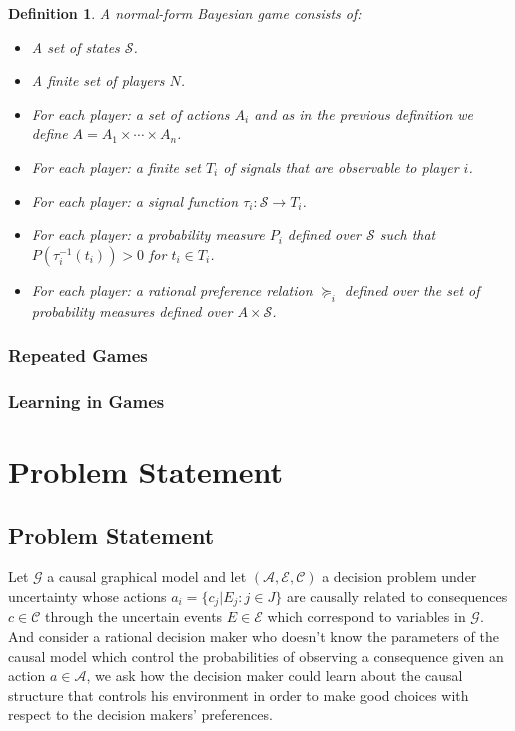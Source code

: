 \documentclass[11pt]{article}
\theoremstyle{plain}
\newtheorem{defi}[teo]{Definition}
\begin{document}
\begin{defi}
A normal-form Bayesian game consists of:
\begin{itemize}
\item A set of states $\mathcal{S}$.
\item A finite set of players $N$.
\item For each player: a set of actions $A_i$ and as in the previous definition we define $A= A_1 \times \cdots \times A_n$.
\item For each player: a finite set $T_i$ of \textit{signals} that are observable to player $i$.
\item For each player: a signal function $\tau_i : \mathcal{S} \to T_i$.
\item For each player: a probability measure $P_i$ defined over $\mathcal{S}$ such that $P(\tau^{-1}_i (t_i)) >0$ for $t_i \in T_i$.
\item For each player: a rational preference relation $\succeq_i$ defined over the set of probability measures defined over $A \times \mathcal{S}$.
\end{itemize}
\end{defi}

\subsubsection{Repeated Games}
\subsubsection{Learning in Games}

\newpage
\section{Problem Statement}
	\subsection{Problem Statement}
	Let  $\mathcal{G}$ a causal graphical model and let $(\mathcal{A},\mathcal{E},\mathcal{C})$ a decision problem under uncertainty whose actions $a_i = \{ c_j | E_j : j \in J \}$  are causally related to consequences $c \in \mathcal{C}$ through the uncertain events $E \in \mathcal{E}$ which correspond to variables in $\mathcal{G}$. And consider a rational decision maker who doesn't know the parameters of the causal model which control the probabilities of observing a consequence given an action $a \in \mathcal{A}$, we ask how the decision maker could learn about the causal structure that controls his environment in order to make good choices with respect to the decision makers' preferences.
\end{document}
